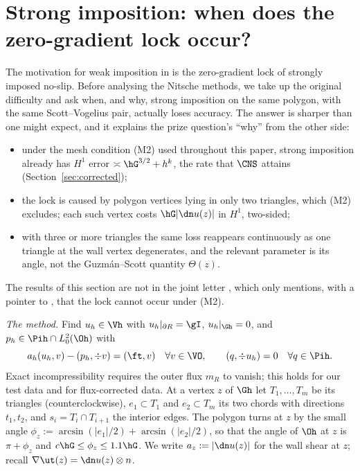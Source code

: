 \section{Strong imposition: when does the zero-gradient lock occur?}\label{sec:strong}

The motivation for weak imposition in \cite{ScottPrize,GjerdeScott2024} is the zero-gradient lock of strongly imposed no-slip. Before analysing the Nitsche methods, we take up the original difficulty and ask when, and why, strong imposition on the same polygon, with the same Scott--Vogelius pair, actually loses accuracy. The answer is sharper than one might expect, and it explains the prize question's ``why'' from the other side:
\begin{itemize}
\item under the mesh condition (M2) used throughout this paper, strong imposition already has $H^1$ error $\asymp\hG^{3/2}+h^k$, the rate that $\CNS$ attains (Section~\ref{sec:corrected});
\item the lock is caused by polygon vertices lying in only two triangles, which (M2) excludes; each such vertex costs $\hG|\dn u(z)|$ in $H^1$, two-sided;
\item with three or more triangles the same loss reappears continuously as one triangle at the wall vertex degenerates, and the relevant parameter is its angle, not the Guzm\'an--Scott quantity $\Theta(z)$.
\end{itemize}

The results of this section are not in the joint letter \cite{CavalcantePadhiLetter}, which only mentions, with a pointer to \cite{PadhiExt}, that the lock cannot occur under (M2).

\emph{The method.} Find $u_h\in\Vh$ with $u_h|_{\partial R}=\gI$, $u_h|_{\Gh}=0$, and $p_h\in\Pih\cap L^2_0(\Oh)$ with
\[
a_h(u_h,v)-(p_h,\div v)=(\ft,v)\quad\forall v\in\VO,\qquad (q,\div u_h)=0\quad\forall q\in\Pih .
\]
Exact incompressibility requires the outer flux $m_R$ to vanish; this holds for our test data and for flux-corrected data. At a vertex $z$ of $\Gh$ let $T_1,\dots,T_m$ be its triangles (counterclockwise), $e_1\subset T_1$ and $e_2\subset T_m$ its two chords with directions $t_1,t_2$, and $s_i=T_i\cap T_{i+1}$ the interior edges. The polygon turns at $z$ by the small angle $\phi_z:=\arcsin(|e_1|/2)+\arcsin(|e_2|/2)$, so that the angle of $\Oh$ at $z$ is $\pi+\phi_z$ and $c\hG\le\phi_z\le1.1\hG$. We write $a_z:=|\dn u(z)|$ for the wall shear at $z$; recall $\nabla\ut(z)=\dn u(z)\otimes n$.


